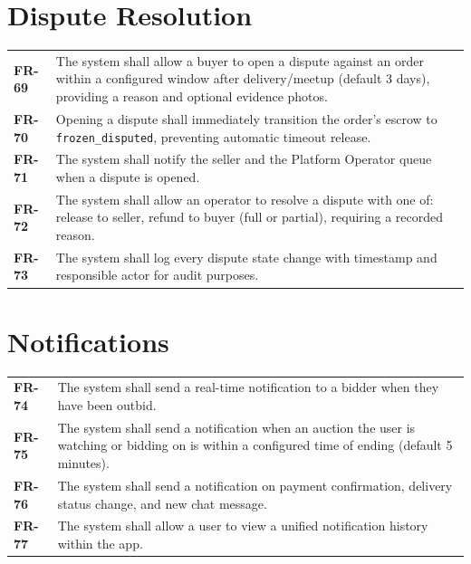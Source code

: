 \documentclass[11pt,a4paper]{report}
\newenvironment{reqtable}{\begin{longtable}{p{2.2cm}p{11.5cm}}}{\end{longtable}}
\begin{document}
\section{Dispute Resolution}
\begin{reqtable}
\textbf{FR-69} & The system shall allow a buyer to open a dispute against an order within a configured window after delivery/meetup (default 3 days), providing a reason and optional evidence photos. \\
\textbf{FR-70} & Opening a dispute shall immediately transition the order's escrow to \texttt{frozen\_disputed}, preventing automatic timeout release. \\
\textbf{FR-71} & The system shall notify the seller and the Platform Operator queue when a dispute is opened. \\
\textbf{FR-72} & The system shall allow an operator to resolve a dispute with one of: release to seller, refund to buyer (full or partial), requiring a recorded reason. \\
\textbf{FR-73} & The system shall log every dispute state change with timestamp and responsible actor for audit purposes. \\
\end{reqtable}

\section{Notifications}
\begin{reqtable}
\textbf{FR-74} & The system shall send a real-time notification to a bidder when they have been outbid. \\
\textbf{FR-75} & The system shall send a notification when an auction the user is watching or bidding on is within a configured time of ending (default 5 minutes). \\
\textbf{FR-76} & The system shall send a notification on payment confirmation, delivery status change, and new chat message. \\
\textbf{FR-77} & The system shall allow a user to view a unified notification history within the app. \\
\end{reqtable}
\end{document}
